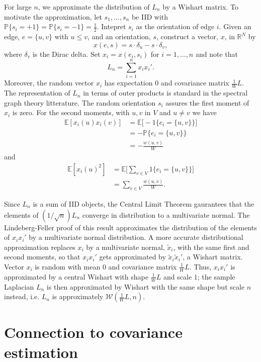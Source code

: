 \documentclass{article}
\newcommand{\reals}{\mathbb{R}}
\newcommand{\prob}{\mathbb{P}}
\newcommand{\E}{\mathbb{E}}
\begin{document}
For large $n$, we approximate the distribution of $L_n$ by a Wishart
matrix.  To motivate the approximation, let $s_1, \ldots, s_n$ be IID
with $\prob\{ s_i = +1 \} = \prob\{ s_i = -1 \} = \tfrac{1}{2}$.
Intepret $s_i$ as the orientation of edge $i$.  Given an edge,
$e = \{ u, v \}$ with $u \leq v$, and an
orientation, $s$, construct a vector, $x$, in $\reals^N$ by
\[
  x(e,s) = s \cdot \delta_u - s \cdot \delta_v,
\]
where $\delta_v$ is the Dirac delta.
Set $x_i = x(e_i, s_i)$ for $i = 1, \ldots, n$ and note that
\[
  L_n = \sum_{i=1}^{n} x_i x_i'.
\]
Moreover, the random vector $x_i$ has expectation $0$ and covariance
matrix $\tfrac{1}{W} L$.  The representation of $L_n$ in terms of
outer products is standard in the spectral graph theory litterature.
The random orientation $s_i$ assures the first moment of $x_i$ is
zero. For the second moments, with $u,v$ in $V$ and $u \neq v$ we have
\begin{align*}
  \E[x_i(u) x_i(v)]
    &= \E\big[ - 1\big\{ e_i = \{u,v\}\big\}\big] \\
    &= - \prob\big\{ e_i = \{u,v\}\big\} \\
    &= -\frac{w(u,v)}{W}
\end{align*}
and
\begin{align*}
  \E[x_i(u)^2]
    &= \E\Big[ \sum_{v \in V} 1\big\{e_i = \{u,v\}\big\} \Big] \\
    &= \sum_{v \in V} \frac{w(u,v)}{W}.
\end{align*}

Since $L_n$ is a sum of IID objects, the Central Limit Theorem gaurantees
that the elements of $(1/\sqrt{n}) L_n$ converge in distribution to a multivariate
normal.  The Lindeberg-Feller proof of this result approximates the
distribution of the elements of $x_i x_i'$ by a multivariate normal
distribution.  A more accurate distributional approximation replaces $x_i$ by a
multivariate normal, $\tilde x_i$, with the same first and second
moments, so that $x_i x_i'$ gets approximated by $\tilde x_i \tilde
x_i'$, a Wishart matrix.
 Vector $x_i$ is random with mean $0$ and covariance matrix
$\tfrac{1}{W} L$.  Thus, $x_i x_i'$ is approximated by a central
Wishart with shape $\tfrac{1}{W} L$ and scale $1$; the sample
Laplacian $L_n$ is then approximated by Wishart with the same shape
but scale $n$ instead, i.e. $L_n$ is approximately $\mathcal{W}(\tfrac{1}{W} L, n)$.

\section{Connection to covariance estimation}
\label{S:connection-to-covariance}
\end{document}
